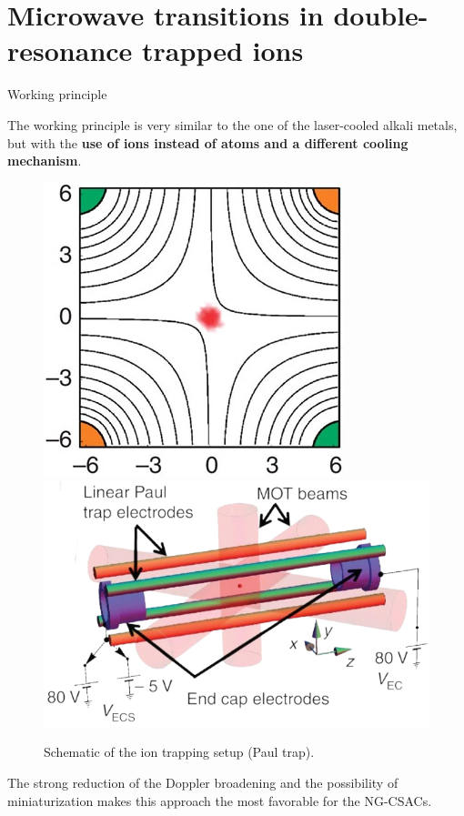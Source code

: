 \section*{Microwave transitions in double-resonance trapped ions}

\begin{frame}{Working principle}

    The working principle is very similar to the one of the laser-cooled alkali metals, but with the \textbf{use of ions instead of atoms and a different cooling mechanism}.

    \begin{figure}
        \centering
        \includegraphics[height=0.35\textheight]{img/Paul-trapping-1.png}
        \hfill
        \includegraphics[height=0.35\textheight]{img/Paul-trapping-2.png}
        \caption{Schematic of the ion trapping setup (Paul trap).}
    \end{figure}

    The strong reduction of the Doppler broadening and the possibility of miniaturization makes this approach the most favorable for the NG-CSACs.


\end{frame}



